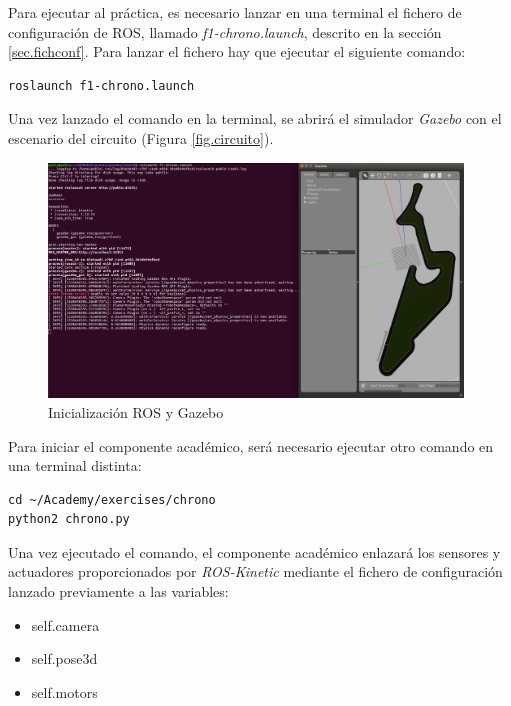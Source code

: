 Para ejecutar al práctica, es necesario lanzar en una terminal el fichero de configuración de ROS, llamado \textit{f1-chrono.launch}, descrito en la sección \ref{sec.fichconf}. Para lanzar el fichero hay que ejecutar el siguiente comando:

\lstset{language=bash, breaklines=true, basicstyle=\footnotesize}
\begin{lstlisting}[frame=single]
roslaunch f1-chrono.launch
\end{lstlisting}

Una vez lanzado el comando en la terminal, se abrirá el simulador \textit{Gazebo} con el escenario del circuito (Figura \ref{fig.circuito}).

\begin{figure}[H]
  \begin{center}
    \includegraphics[width=0.98\textwidth]{figures/roslaunch_chrono.png}
		\caption{Inicialización ROS y Gazebo}
		\label{fig.roslaunchch}
		\end{center}
\end{figure}

Para iniciar el componente académico, será necesario ejecutar otro comando en una terminal distinta:

\lstset{language=bash, breaklines=true, basicstyle=\footnotesize}
\begin{lstlisting}[frame=single]
cd ~/Academy/exercises/chrono
python2 chrono.py
\end{lstlisting}

Una vez ejecutado el comando, el componente académico enlazará los sensores y actuadores proporcionados por \textit{ROS-Kinetic} mediante el fichero de configuración lanzado previamente a las variables:

\begin{itemize}
    \item self.camera
    \item self.pose3d
    \item self.motors
\end{itemize}

